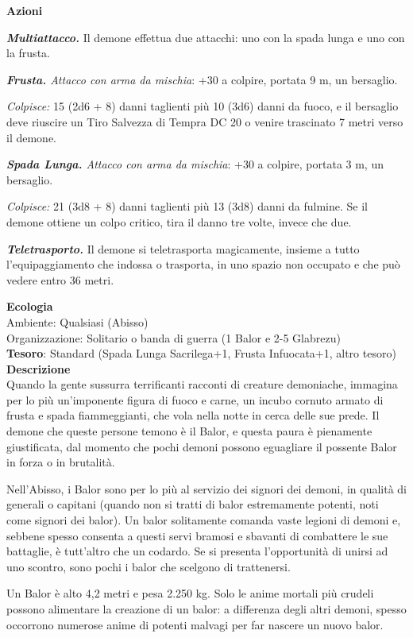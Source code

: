 \begin{multicols}{2}
	\textbf{Azioni}

	\textit{\textbf{Multiattacco.}} Il demone effettua due attacchi: uno con la spada lunga e uno con la frusta.

	\textit{\textbf{Frusta.} Attacco con arma da mischia}: +30 a colpire, portata 9 m, un bersaglio.

	\textit{Colpisce:} 15 (2d6 + 8) danni taglienti più 10 (3d6) danni da fuoco, e il bersaglio deve riuscire un Tiro Salvezza di Tempra DC 20 o venire trascinato 7 metri verso il demone.

	\textit{\textbf{Spada Lunga.} Attacco con arma da mischia}: +30 a colpire, portata 3 m, un bersaglio.

	\textit{Colpisce:} 21 (3d8 + 8) danni taglienti più 13 (3d8) danni da fulmine. Se il demone ottiene un colpo critico, tira il danno tre volte, invece che due.

	\textit{\textbf{Teletrasporto.}} Il demone si teletrasporta magicamente, insieme a tutto l'equipaggiamento che indossa o trasporta, in uno spazio non occupato e che può vedere entro 36 metri.

	\textbf{Ecologia}\\
	Ambiente: Qualsiasi (Abisso)\\
	Organizzazione: Solitario o banda di guerra (1 Balor e 2-5 Glabrezu)\\
	\textbf{Tesoro}: Standard (Spada Lunga Sacrilega+1, Frusta Infuocata+1, altro tesoro)\\
	\textbf{Descrizione}\\
	Quando la gente sussurra terrificanti racconti di creature demoniache, immagina per lo più un'imponente figura di fuoco e carne, un incubo cornuto armato di frusta e spada fiammeggianti, che vola nella notte in cerca delle sue prede. Il demone che queste persone temono è il Balor, e questa paura è pienamente giustificata, dal momento che pochi demoni possono eguagliare il possente Balor in forza o in brutalità.

	Nell'Abisso, i Balor sono per lo più al servizio dei signori dei demoni, in qualità di generali o capitani (quando non si tratti di balor estremamente potenti, noti come signori dei balor). Un balor solitamente comanda vaste legioni di demoni e, sebbene spesso consenta a questi servi bramosi e sbavanti di combattere le sue battaglie, è tutt'altro che un codardo. Se si presenta l'opportunità di unirsi ad uno scontro, sono pochi i balor che scelgono di trattenersi.

	Un Balor è alto 4,2 metri e pesa 2.250 kg. Solo le anime mortali più crudeli possono alimentare la creazione di un balor: a differenza degli altri demoni, spesso occorrono numerose anime di potenti malvagi per far nascere un nuovo balor.


\end{multicols}
